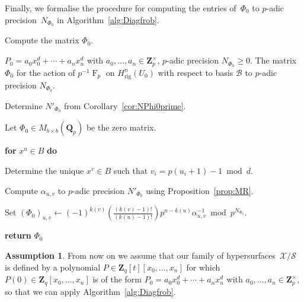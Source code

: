 \documentclass[a4paper,11pt]{article}
\numberwithin{equation}{section}
\newcommand{\ZZ}{\mathbf{Z}} %
\newcommand{\QQ}{\mathbf{Q}} %
\DeclareMathOperator{\Frob}{F}           %
\providecommand{\Hrig}{H_{\text{rig}}}  %
\providecommand{\cB}{\mathcal{B}} %
\theoremstyle{definition}
\newtheorem{assump}[thm]{Assumption}
\begin{document}
Finally, we formalise the procedure for computing the entries of~$\Phi_0$ to 
$p$-adic precision~$N_{\Phi_0}$ in Algorithm~\ref{alg:Diagfrob}.

\begin{algorithm}
\caption{Compute the matrix $\Phi_0$.}
\label{alg:Diagfrob}
\begin{algorithmic}
\vspace{1mm}
\Require $P_0=a_0 x_0^d + \dotsb + a_n x_n^d$ 
         with $a_0,\dotsc,a_n \in \ZZ_p^{\times}$, 
         $p$-adic precision $N_{\Phi_0} \geq 0$.
\Ensure  The matrix $\Phi_0$ for the action of $p^{-1} \Frob_p$ 
         on $\Hrig^n(U_0)$ with respect to basis $\cB$ to $p$-adic 
         precision $N_{\Phi_0}$.
\State \begin{compactenum}[{\hspace{1em}} 1.] \vspace{-1.24em}
\item Determine $N'_{\Phi_0}$ from Corollary~\ref{cor:NPhi0prime}. 
\item Let $\Phi_0 \in M_{b \times b}(\QQ_p)$ be the zero matrix.
\item[] \textbf{for} $x^u \in B$ \textbf{do} 
\item[] \begin{compactenum}[{\hspace{1em}} 1.]
        \item Determine the unique $x^v \in B$ such that $v_i = p (u_i + 1) - 1 \bmod{d}$.
        \item Compute $\alpha_{u,v}$ to $p$-adic 
              precision $N'_{\Phi_0}$ using Proposition~\ref{prop:MR}.
        \item Set $(\Phi_0)_{u,v} \gets (-1)^{k(v)} \left( \frac{ (k(v)-1)!}{(k(u)-1)!} \right) p^{n-k(u)} \alpha_{u,v}^{-1} \bmod{p^{N_{\Phi_0}}}$.
      \end{compactenum}   
 \item \textbf{return} $\Phi_0$      
\end{compactenum}
\EndProcedure
\end{algorithmic}
\end{algorithm}

\begin{assump} \label{assump:diag}
From now on we assume that our family of 
hypersurfaces~$\mathcal{X}/\mathcal{S}$ is defined by a 
polynomial $P \in \ZZ_q[t][x_0,\dotsc,x_n]$ for which 
$P(0) \in \ZZ_q[x_0,\dotsc,x_n]$ is of the form 
$P_0=a_0 x_0^d + \dotsb + a_n x_n^d$ with $a_0,\dotsc,a_n \in \ZZ_p^{\times}$, 
so that we can apply Algorithm~\ref{alg:Diagfrob}. 
\end{assump}
\end{document}
